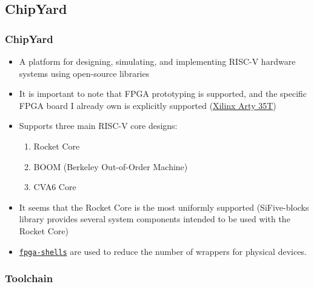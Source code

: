 \documentclass{weeklyslides}
\begin{document}
\subsection{ChipYard}\label{subsec:ChipYard}
\begin{frame}
  \frametitle{ChipYard~\cite{chipyard}}
  \begin{itemize}
  \item A platform for designing, simulating, and implementing RISC-V hardware systems using open-source libraries
  \item It is important to note that FPGA prototyping is supported, and the specific FPGA board I already own is explicitly supported (\href{https://www.xilinx.com/products/boards-and-kits/arty.html}{Xilinx Arty 35T})
  \item Supports three main RISC-V core designs:
    \begin{enumerate}
    \item Rocket Core
    \item BOOM (Berkeley Out-of-Order Machine)
    \item CVA6 Core
    \end{enumerate}
  \item It seems that the Rocket Core is the most uniformly supported (SiFive-blocks library provides several system components intended to be used with the Rocket Core)
  \item \href{https://github.com/sifive/fpga-shells}{\texttt{fpga-shells}} are used to reduce the number of wrappers for physical devices.
  \end{itemize}

\end{frame}

\subsubsection{Toolchain}\label{subsubsec:Toolchain} %
\begin{frame}
  \frametitle{}
\end{frame}
\end{document}
